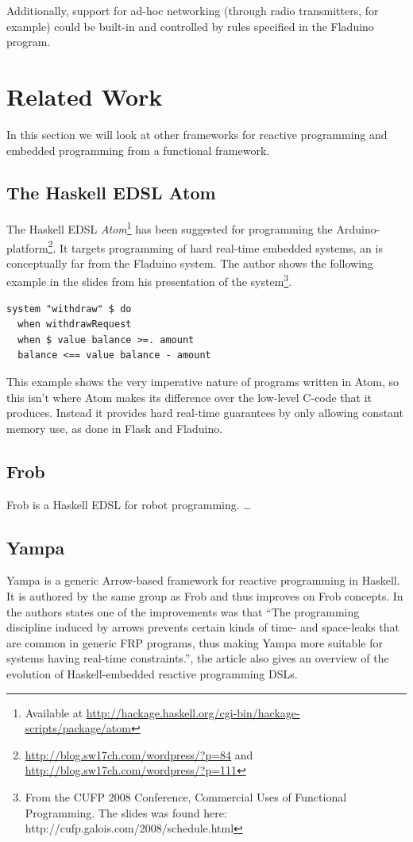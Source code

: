 \documentclass[a4paper, oneside, final]{memoir}
\begin{document}
Additionally, support for ad-hoc networking (through radio
transmitters, for example) could be built-in and controlled by rules
specified in the Fladuino program.

\chapter{Related Work}
In this section we will look at other frameworks for reactive
programming and embedded programming from a functional framework.

\section{The Haskell EDSL Atom}
The Haskell EDSL \textit{Atom}\footnote{Available at
  \url{http://hackage.haskell.org/cgi-bin/hackage-scripts/package/atom}}
has been suggested for programming the
Arduino-platform\footnote{\url{http://blog.sw17ch.com/wordpress/?p=84}
  and \url{http://blog.sw17ch.com/wordpress/?p=111}}.  It targets
programming of hard real-time embedded systems, an is conceptually far
from the Fladuino system. The author shows the following example in
the slides from his presentation of the system\footnote{From the CUFP
  2008 Conference, Commercial Uses of Functional Programming. The
  slides was found here: http://cufp.galois.com/2008/schedule.html}.

\begin{verbatim}
system "withdraw" $ do
  when withdrawRequest
  when $ value balance >=. amount
  balance <== value balance - amount
\end{verbatim}

This example shows the very imperative nature of programs written in
Atom, so this isn't where Atom makes its difference over the low-level
C-code that it produces. Instead it provides hard real-time guarantees
by only allowing constant memory use, as done in Flask and Fladuino.

\section{Frob}
Frob is a Haskell EDSL for robot programming. \ldots

\section{Yampa}
Yampa is a generic Arrow-based framework for reactive programming in
Haskell. It is authored by the same group as Frob and thus improves on
Frob concepts. In \cite{arrowsrobotsfrp02} the authors states one of
the improvements was that ``The programming discipline induced by
arrows prevents certain kinds of time- and space-leaks that are common
in generic FRP programs, thus making Yampa more suitable for systems
having real-time constraints.'', the article also gives an overview of
the evolution of Haskell-embedded reactive programming DSLs.
\end{document}
